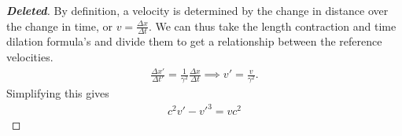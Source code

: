 \documentclass[11pt]{article}
\theoremstyle{definition}
\newenvironment{Deleted}
{\let\oldqedsymbol=\qedsymbol
	\renewcommand{\qedsymbol}{$ $}
	\begin{proof}[\bfseries\upshape \color{red}Deleted]\color{red}}
	{\end{proof}
	\renewcommand{\qedsymbol}{\oldqedsymbol}}
\begin{document}
\begin{Deleted}
By definition, a velocity is determined by the change in distance over the change in time, or $v=\frac{\Delta x}{\Delta t}$. We can thus take the length contraction and time dilation formula's and divide them to get a relationship between the reference velocities.
\begin{align}
\frac{\Delta x'}{\Delta t'} = \frac{1}{\gamma^2}\frac{\Delta x}{\Delta t} \implies v' = \frac{v}{\gamma^2}.
\end{align}
Simplifying this gives
\begin{align}
c^2v'-v'^3 = vc^2
\end{align}
\end{Deleted}


	





\end{document}

